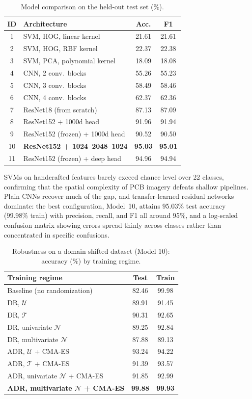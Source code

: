 \documentclass[10pt,twocolumn,a4paper]{article}
\begin{document}
\begin{table}[t]
\centering
\small
\caption{Model comparison on the held-out test set (\%).}
\label{tab:models}
\begin{tabular}{@{}clcc@{}}
\toprule
ID & Architecture & Acc. & F1 \\
\midrule
1 & SVM, HOG, linear kernel & 21.61 & 21.61 \\
2 & SVM, HOG, RBF kernel & 22.37 & 22.38 \\
3 & SVM, PCA, polynomial kernel & 18.09 & 18.08 \\
4 & CNN, 2 conv.\ blocks & 55.26 & 55.23 \\
5 & CNN, 3 conv.\ blocks & 58.49 & 58.46 \\
6 & CNN, 4 conv.\ blocks & 62.37 & 62.36 \\
7 & ResNet18 (from scratch) & 87.13 & 87.09 \\
8 & ResNet152 + 1000d head & 91.96 & 91.94 \\
9 & ResNet152 (frozen) + 1000d head & 90.52 & 90.50 \\
10 & \textbf{ResNet152 + 1024--2048--1024} & \textbf{95.03} & \textbf{95.01} \\
11 & ResNet152 (frozen) + deep head & 94.96 & 94.94 \\
\bottomrule
\end{tabular}
\end{table}

SVMs on handcrafted features barely exceed chance level over 22 classes, confirming that the spatial complexity of PCB imagery defeats shallow pipelines. Plain CNNs recover much of the gap, and transfer-learned residual networks dominate: the best configuration, Model~10, attains 95.03\% test accuracy (99.98\% train) with precision, recall, and F1 all around 95\%, and a log-scaled confusion matrix showing errors spread thinly across classes rather than concentrated in specific confusions.

\begin{table}[t]
\centering
\small
\caption{Robustness on a domain-shifted dataset (Model 10): accuracy (\%) by training regime.}
\label{tab:adr}
\begin{tabular}{@{}lcc@{}}
\toprule
Training regime & Test & Train \\
\midrule
Baseline (no randomization) & 82.46 & 99.98 \\
DR, $\mathcal{U}$ & 89.91 & 91.45 \\
DR, $\mathcal{T}$ & 90.31 & 92.65 \\
DR, univariate $\mathcal{N}$ & 89.25 & 92.84 \\
DR, multivariate $\mathcal{N}$ & 87.88 & 89.13 \\
ADR, $\mathcal{U}$ + CMA-ES & 93.24 & 94.22 \\
ADR, $\mathcal{T}$ + CMA-ES & 91.39 & 93.57 \\
ADR, univariate $\mathcal{N}$ + CMA-ES & 91.85 & 92.99 \\
\textbf{ADR, multivariate $\mathcal{N}$ + CMA-ES} & \textbf{99.88} & \textbf{99.93} \\
\bottomrule
\end{tabular}
\end{table}
\end{document}
